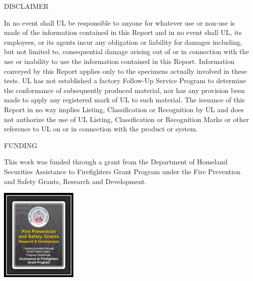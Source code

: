 \documentclass{article}
\begin{document}
\begin{center}
	DISCLAIMER\\
	\vspace*{\baselineskip}
	\begin{adjustwidth}{-0.25in}{-0.25in}
		In no event shall UL be responsible to anyone for whatever use or non-use is made of the information contained in this Report and in no event shall UL, its employees, or its agents incur any obligation or liability for damages including, but not limited to, consequential damage arising out of or in connection  with the use or inability to use the information contained in this Report. Information conveyed by this Report applies only to the specimens actually involved in these tests. UL has not established a factory Follow-Up Service Program to determine the conformance of subsequently produced material, nor has any provision been made to apply any registered mark of UL to such material. The issuance of this Report in no way implies Listing, Classification or Recognition by UL and does not authorize the use of UL Listing, Classification or Recognition Marks or other reference to UL on or in connection with the product or system.
	\end{adjustwidth}
\end{center}

\begin{center}
	FUNDING
\vspace*{\baselineskip}
\begin{adjustwidth}{-0.25in}{-0.25in}
This work was funded through a grant from the Department of Homeland Securities Assistance to Firefighters Grant Program under the Fire Prevention and Safety Grants, Research and Development.
\end{adjustwidth}
\end{center}

\begin{center}
	\includegraphics[width=0.28\textwidth]{Figures/General/DHS.png}
\end{center}

\clearpage
\end{document}

